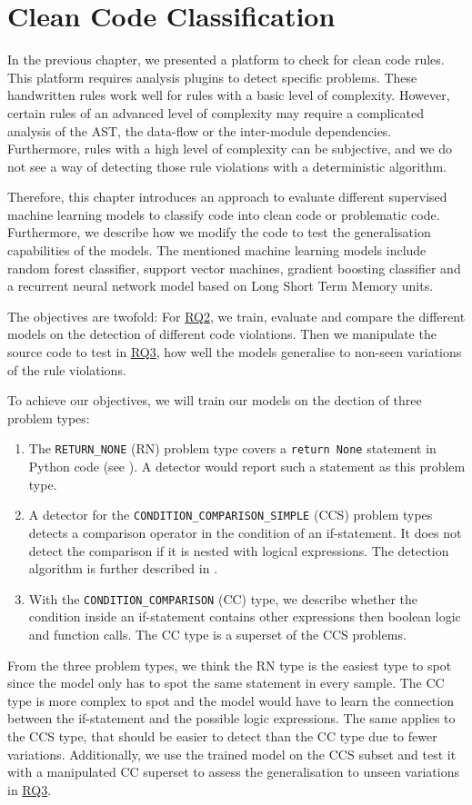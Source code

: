 \section{Clean Code Classification}\label{chap:clean_code_classification}
In the previous chapter, we presented a platform to check for clean code rules. This platform requires analysis plugins to detect specific problems. These handwritten rules work well for rules with a basic level of complexity. However, certain rules of an advanced level of complexity may require a complicated analysis of the AST, the data-flow or the inter-module dependencies. Furthermore, rules with a high level of complexity can be subjective, and we do not see a way of detecting those rule violations with a deterministic algorithm.

Therefore, this chapter introduces an approach to evaluate different supervised machine learning models to classify code into clean code or problematic code. Furthermore, we describe how we modify the code to test the generalisation capabilities of the models. The mentioned machine learning models include random forest classifier, support vector machines, gradient boosting classifier and a recurrent neural network model based on Long Short Term Memory units. 

The objectives are twofold: For \hyperref[rq:2]{RQ2}, we train, evaluate and compare the different models on the detection of different code violations. Then we manipulate the source code to test in \hyperref[rq:3]{RQ3}, how well the models generalise to non-seen variations of the rule violations.

To achieve our objectives, we will train our models on the dection of three problem types: 
\begin{enumerate}
    \item The \texttt{RETURN\_NONE} (RN) problem type covers a \texttt{return None} statement in Python code (see ). A detector would report such a statement as this problem type.
    \item A detector for the \texttt{CONDITION\_COMPARISON\_SIMPLE} (CCS) problem types detects a comparison operator in the condition of an if-statement. It does not detect the comparison if it is nested with logical expressions. The detection algorithm is further described in .
    \item With the \texttt{CONDITION\_COMPARISON} (CC) type, we describe whether the condition inside an if-statement contains other expressions then boolean logic and function calls. The CC type is a superset of the CCS problems. 
\end{enumerate}
From the three problem types, we think the RN type is the easiest type to spot since the model only has to spot the same statement in every sample. The CC type is more complex to spot and the model would have to learn the connection between the if-statement and the possible logic expressions. The same applies to the CCS type, that should be easier to detect than the CC type due to fewer variations. Additionally, we use the trained model on the CCS subset and test it with a manipulated CC superset to assess the generalisation to unseen variations in \hyperref[rq:3]{RQ3}.

